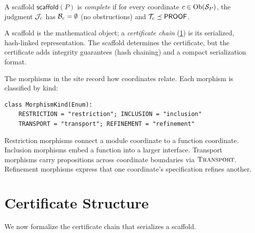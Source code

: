 \documentclass[11pt]{article}
\newcommand{\scaffold}{\mathsf{scaffold}}
\begin{document}
\begin{definition}\label{def:scaffold-complete}
A scaffold $\scaffold(P)$ is \emph{complete} if for every
coordinate $c \in \mathrm{Ob}(\mathcal{S}_P)$, the judgment $\mathcal{J}_c$ has
$\mathcal{B}_c = \emptyset$ (no obstructions) and $\mathcal{T}_c \preceq \mathsf{PROOF}$.
\end{definition}

\begin{remark}\label{rem:scaffold-vs-cert}
A scaffold is the mathematical object; a \emph{certificate chain}
(\cref{sec:structure}) is its serialized, hash-linked representation.
The scaffold determines the certificate, but the certificate adds
integrity guarantees (hash chaining) and a compact serialization format.
\end{remark}

The morphisms in the site record how coordinates relate.  Each
morphism is classified by kind:

\begin{lstlisting}[style=jugeo-python,caption={Morphism kinds.}]
class MorphismKind(Enum):
    RESTRICTION = "restriction"; INCLUSION = "inclusion"
    TRANSPORT = "transport"; REFINEMENT = "refinement"
\end{lstlisting}

Restriction morphisms connect a module coordinate to a function
coordinate.  Inclusion morphisms embed a function into a larger
interface.  Transport morphisms carry propositions across coordinate
boundaries via $\textsc{Transport}$.  Refinement morphisms express that one
coordinate's specification refines another.

\section{Certificate Structure}\label{sec:structure}

We now formalize the certificate chain that serializes a scaffold.
\end{document}
